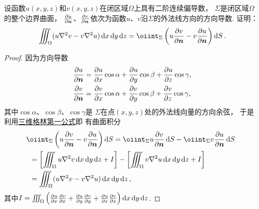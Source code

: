 \begin{example}[三维格林第二公式]
设函数\(u(x,y,z)\)和\(v(x,y,z)\)在闭区域\(\Omega\)上具有二阶连续偏导数，
\(\Sigma\)是闭区域\(\Omega\)的整个边界曲面，
\(\pdv{u}{\boldsymbol{n}}\)、\(\pdv{v}{\boldsymbol{n}}\)依次为函数\(u\)、\(v\)沿\(\Sigma\)的外法线方向的方向导数.
证明：
\begin{equation}\label{equation:线积分与面积分.三维格林第二公式}
	\iiint_\Omega (u \laplacian{v} - v \laplacian{u}) \dd{x}\dd{y}\dd{z}
	=\oiint_\Sigma \left( u \pdv{v}{\vb{n}} - v \pdv{u}{\vb{n}} \right) \dd{S}.
\end{equation}
\begin{proof}
\def\Io{\iiint_\Omega \left(%
	\pdv{u}{x} \pdv{v}{x}%
	+\pdv{u}{y} \pdv{v}{y}%
	+\pdv{u}{z} \pdv{v}{z}%
\right) \dd{x}\dd{y}\dd{z}}%
因为方向导数\begin{align*}
	\pdv{u}{\boldsymbol{n}}
	&= \pdv{u}{x} \cos\alpha
	+ \pdv{u}{y} \cos\beta
	+ \pdv{u}{z} \cos\gamma, \\
	\pdv{v}{\boldsymbol{n}}
	&= \pdv{v}{x} \cos\alpha
	+ \pdv{v}{y} \cos\beta
	+ \pdv{v}{z} \cos\gamma,
\end{align*}
其中\(\cos\alpha\)、\(\cos\beta\)、\(\cos\gamma\)是
\(\Sigma\)在点\((x,y,z)\)处的外法线向量的方向余弦，
于是利用\hyperref[equation:线积分与面积分.三维格林第一公式]{三维格林第一公式}即
有曲面积分\begin{align*}
	&\hspace{-5pt}
	\oiint_\Sigma \left( u \pdv{v}{\vb{n}} - v \pdv{u}{\vb{n}} \right) \dd{S}
	= \oiint_\Sigma u \pdv{v}{\vb{n}} \dd{S}
		- \oiint_\Sigma v \pdv{u}{\vb{n}} \dd{S} \\
	&= \left[ \iiint_\Omega u \laplacian{v} \dd{x}\dd{y}\dd{z} + I \right]
		- \left[ \iiint_\Omega v \laplacian{u} \dd{x}\dd{y}\dd{z} + I \right] \\
	&= \iiint_\Omega (u \laplacian{v} - v \laplacian{u}) \dd{x}\dd{y}\dd{z},
\end{align*}
其中\(I = \Io\).
\end{proof}
\end{example}

